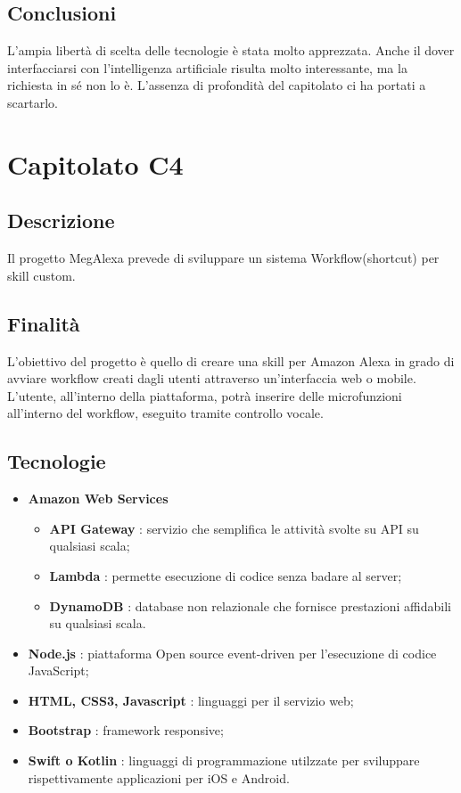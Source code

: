 			\subsection{Conclusioni}
                L'ampia libertà di scelta delle tecnologie è stata molto apprezzata. Anche il dover interfacciarsi con l'intelligenza artificiale risulta molto interessante, ma la richiesta in sé non lo è. L'assenza di profondità del capitolato ci ha portati a scartarlo.
\newpage
    \section{Capitolato C4}
        \subsection{Descrizione}
            Il progetto MegAlexa prevede di sviluppare un sistema Workflow(shortcut) per skill custom.
        \subsection{Finalità}
            L'obiettivo del progetto è quello di creare una skill per Amazon Alexa in grado di avviare workflow creati dagli utenti attraverso un'interfaccia web o mobile.
			L'utente, all'interno della piattaforma, potrà inserire delle microfunzioni all'interno del workflow, eseguito tramite controllo vocale.
        \subsection{Tecnologie}
            \begin{itemize}
                \item \textbf{Amazon Web Services}
                    \begin{itemize}
                        \item \textbf{API Gateway} : servizio che semplifica le attività svolte su API su qualsiasi scala;
                        \item \textbf{Lambda} : permette esecuzione di codice senza badare al server;
                        \item \textbf{DynamoDB} : database non relazionale che fornisce prestazioni affidabili su qualsiasi scala.
                    \end{itemize}
                    \item \textbf{Node.js} : piattaforma Open source event-driven per l'esecuzione di codice JavaScript;
                    \item \textbf{HTML, CSS3, Javascript} : linguaggi per il servizio web;
                    \item \textbf{Bootstrap} : framework responsive;
                    \item \textbf{Swift o Kotlin} : linguaggi di programmazione utilzzate per sviluppare rispettivamente applicazioni per iOS e Android.
            \end{itemize}
